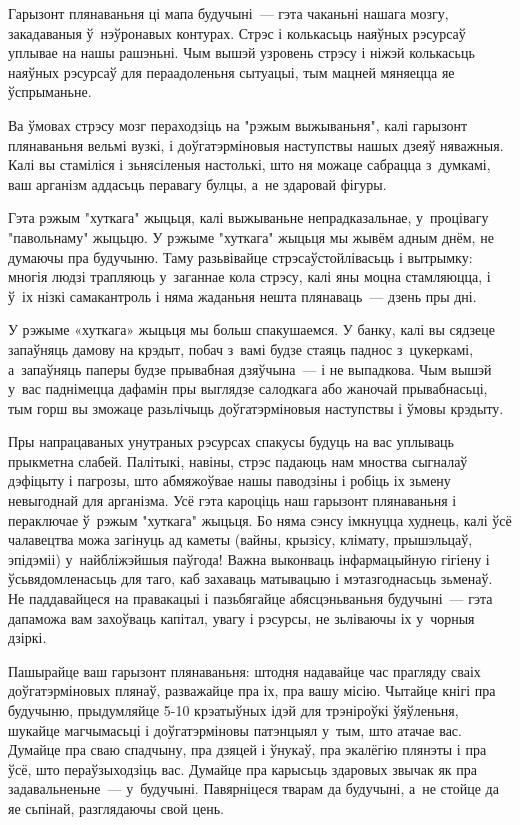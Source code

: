 Гарызонт плянаваньня ці мапа будучыні~--- гэта чаканьні нашага мозгу, закадаваныя ў~нэўронавых контурах. Стрэс і колькасьць наяўных рэсурсаў уплывае на нашы рашэньні. Чым вышэй узровень стрэсу і ніжэй колькасьць наяўных рэсурсаў для пераадоленьня сытуацыі, тым мацней мяняецца яе ўспрыманьне.

Ва ўмовах стрэсу мозг пераходзіць на "рэжым выжываньня", калі гарызонт плянаваньня вельмі вузкі, і доўгатэрміновыя наступствы нашых дзеяў няважныя. Калі вы стаміліся і зьнясіленыя настолькі, што ня можаце сабрацца з~думкамі, ваш арганізм аддасьць перавагу булцы, а~не здаровай фігуры.

Гэта рэжым "хуткага" жыцьця, калі выжываньне непрадказальнае, у~процівагу "павольнаму" жыцьцю. У рэжыме "хуткага" жыцьця мы жывём адным днём, не думаючы пра будучыню. Таму разьвівайце стрэсаўстойлівасьць і вытрымку: многія людзі трапляюць у~заганнае кола стрэсу, калі яны моцна стамляюцца, і ў~іх нізкі самакантроль і няма жаданьня нешта плянаваць~--- дзень пры дні.

У рэжыме «хуткага» жыцьця мы больш спакушаемся. У банку, калі вы сядзеце запаўняць дамову на крэдыт, побач з~вамі будзе стаяць паднос з~цукеркамі, а~запаўняць паперы будзе прывабная дзяўчына~--- і не выпадкова. Чым вышэй у~вас паднімецца дафамін пры выглядзе салодкага або жаночай прывабнасьці, тым горш вы зможаце разьлічыць доўгатэрміновыя наступствы і ўмовы крэдыту.

Пры напрацаваных унутраных рэсурсах спакусы будуць на вас уплываць прыкметна слабей. Палітыкі, навіны, стрэс падаюць нам мноства сыгналаў дэфіцыту і пагрозы, што абмяжоўвае нашы паводзіны і робіць іх зьмену невыгоднай для арганізма. Усё гэта кароціць наш гарызонт плянаваньня і пераключае ў~рэжым "хуткага" жыцьця. Бо няма сэнсу імкнуцца худнець, калі ўсё чалавецтва можа загінуць ад каметы (вайны, крызісу, клімату, прышэльцаў, эпідэміі) у~найбліжэйшыя паўгода! Важна выконваць інфармацыйную гігіену і ўсьвядомленасьць для таго, каб захаваць матывацыю і мэтазгоднасьць зьменаў. Не паддавайцеся на правакацыі і пазьбягайце абясцэньваньня будучыні~--- гэта дапаможа вам захоўваць капітал, увагу і рэсурсы, не зьліваючы іх у~чорныя дзіркі.

Пашырайце ваш гарызонт плянаваньня: штодня надавайце час прагляду сваіх доўгатэрміновых плянаў, разважайце пра іх, пра вашу місію. Чытайце кнігі пра будучыню, прыдумляйце 5-10 крэатыўных ідэй для трэніроўкі ўяўленьня, шукайце магчымасьці і доўгатэрміновы патэнцыял у~тым, што атачае вас. Думайце пра сваю спадчыну, пра дзяцей і ўнукаў, пра экалёгію плянэты і пра ўсё, што пераўзыходзіць вас. Думайце пра карысьць здаровых звычак як пра задавальненьне~--- у~будучыні. Павярніцеся тварам да будучыні, а~не стойце да яе сьпінай, разглядаючы свой цень.


